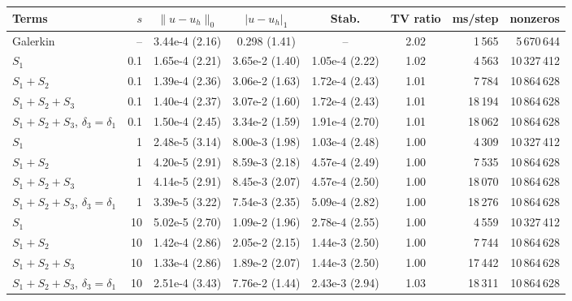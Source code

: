 \begin{tabular}{lrccccrr}
\toprule
Terms & $s$ & $\|u-u_h\|_0$ & $|u-u_h|_1$ & Stab. & TV ratio & ms/step & nonzeros \\
\midrule
Galerkin & -- & 3.44e-4 (2.16) & 0.298 (1.41) & -- & 2.02 & 1\,565 & 5\,670\,644 \\
$S_1$ & 0.1 & 1.65e-4 (2.21) & 3.65e-2 (1.40) & 1.05e-4 (2.22) & 1.02 & 4\,563 & 10\,327\,412 \\
$S_1+S_2$ & 0.1 & 1.39e-4 (2.36) & 3.06e-2 (1.63) & 1.72e-4 (2.43) & 1.01 & 7\,784 & 10\,864\,628 \\
$S_1+S_2+S_3$ & 0.1 & 1.40e-4 (2.37) & 3.07e-2 (1.60) & 1.72e-4 (2.43) & 1.01 & 18\,194 & 10\,864\,628 \\
$S_1+S_2+S_3$, $\delta_3=\delta_1$ & 0.1 & 1.50e-4 (2.45) & 3.34e-2 (1.59) & 1.91e-4 (2.70) & 1.01 & 18\,062 & 10\,864\,628 \\
$S_1$ & 1 & 2.48e-5 (3.14) & 8.00e-3 (1.98) & 1.03e-4 (2.48) & 1.00 & 4\,309 & 10\,327\,412 \\
$S_1+S_2$ & 1 & 4.20e-5 (2.91) & 8.59e-3 (2.18) & 4.57e-4 (2.49) & 1.00 & 7\,535 & 10\,864\,628 \\
$S_1+S_2+S_3$ & 1 & 4.14e-5 (2.91) & 8.45e-3 (2.07) & 4.57e-4 (2.50) & 1.00 & 18\,070 & 10\,864\,628 \\
$S_1+S_2+S_3$, $\delta_3=\delta_1$ & 1 & 3.39e-5 (3.22) & 7.54e-3 (2.35) & 5.09e-4 (2.82) & 1.00 & 18\,276 & 10\,864\,628 \\
$S_1$ & 10 & 5.02e-5 (2.70) & 1.09e-2 (1.96) & 2.78e-4 (2.55) & 1.00 & 4\,559 & 10\,327\,412 \\
$S_1+S_2$ & 10 & 1.42e-4 (2.86) & 2.05e-2 (2.15) & 1.44e-3 (2.50) & 1.00 & 7\,744 & 10\,864\,628 \\
$S_1+S_2+S_3$ & 10 & 1.33e-4 (2.86) & 1.89e-2 (2.07) & 1.44e-3 (2.50) & 1.00 & 17\,442 & 10\,864\,628 \\
$S_1+S_2+S_3$, $\delta_3=\delta_1$ & 10 & 2.51e-4 (3.43) & 7.76e-2 (1.44) & 2.43e-3 (2.94) & 1.03 & 18\,311 & 10\,864\,628 \\
\bottomrule
\end{tabular}
